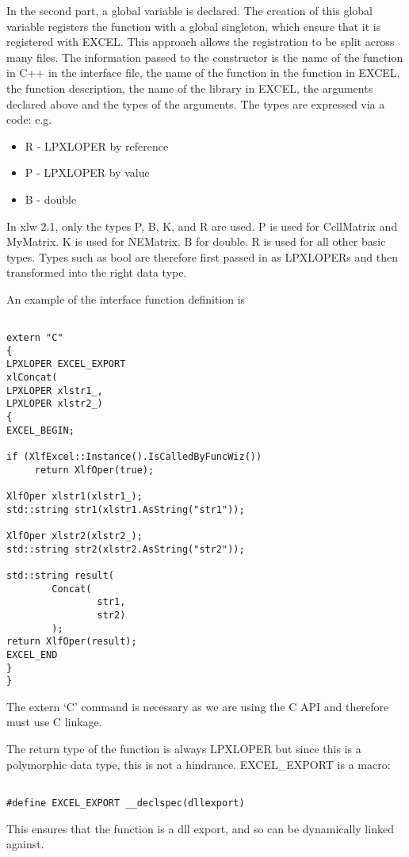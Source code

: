 \documentclass[12pt,reqno]{amsart}
\numberwithin{equation}{section}
\numberwithin{figure}{section}
\begin{document}
In the second part, a global variable is declared. The creation of
this global variable registers the function with a global singleton,
which ensure that it is registered with EXCEL. This approach allows
the registration to be split across many files. The information passed
to the constructor is the name of the function in C++ in the interface
file, the name of the function in the function in EXCEL, the function
description, the name of the library in EXCEL, the arguments declared
above and the types of the arguments. The types are expressed via a
code: e.g. 
\begin{itemize}
\item R - LPXLOPER by reference
\item P - LPXLOPER by value
\item B - double
\end{itemize}

In xlw 2.1, only the types P, B, K, and R are used. P is used for CellMatrix
and MyMatrix. K is used for NEMatrix. B for double. 
R is used for all other basic types. Types such as bool 
are therefore first passed in as LPXLOPERs and then transformed
into the right data type. 

An example of the interface function definition is 

\begin{verbatim}

extern "C"
{
LPXLOPER EXCEL_EXPORT
xlConcat(
LPXLOPER xlstr1_,
LPXLOPER xlstr2_)
{
EXCEL_BEGIN;

if (XlfExcel::Instance().IsCalledByFuncWiz())
     return XlfOper(true);

XlfOper xlstr1(xlstr1_);
std::string str1(xlstr1.AsString("str1"));

XlfOper xlstr2(xlstr2_);
std::string str2(xlstr2.AsString("str2"));

std::string result(
        Concat(
                str1,
                str2)
        );
return XlfOper(result);
EXCEL_END
}
}

\end{verbatim}

The extern `C' command is necessary as we are using the C API and
therefore must use C linkage. 

The return type of the function is always LPXLOPER but since this is a
polymorphic data type, this is not a hindrance.  EXCEL\_EXPORT is a
macro:
\begin{verbatim}

#define EXCEL_EXPORT __declspec(dllexport)

\end{verbatim}
This ensures that the function is a dll export, and so can be
dynamically linked against. 
\end{document}
